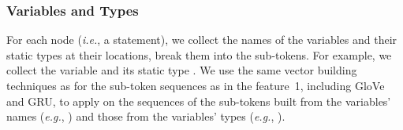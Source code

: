 
\vspace{-1pt}
\subsubsection{Variables and Types}

For each node ({\em i.e.}, a statement), we collect the names of the
variables and their static types at their locations, break them into
the sub-tokens. For example, we collect the variable 
and its static type .
%
We use the same vector building techniques as for the sub-token
sequences as in the feature~1, including GloVe and GRU, to apply on the
sequences of the sub-tokens built from the variables' names ({\em e.g.},
) and those from the variables' types ({\em e.g.},
).




